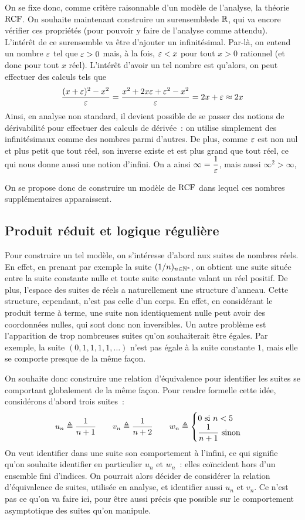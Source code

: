 On se fixe donc, comme critère raisonnable d'un modèle de l'analyse, la théorie
$\operatorname{RCF}$. On souhaite maintenant construire un \og surensemble\fg de $\mathbb R$, qui
va encore vérifier ces propriétés (pour pouvoir y faire de l'analyse comme
attendu). L'intérêt de ce surensemble va être d'ajouter un infinitésimal.
Par-là, on entend un nombre $\varepsilon$ tel que $\varepsilon > 0$ mais, à la fois,
$\varepsilon < x$ pour tout $x > 0$ rationnel (et donc pour tout $x$ réel).
L'intérêt d'avoir un tel nombre est qu'alors, on peut effectuer des calculs
tels que
\[\frac{(x+\varepsilon)^2 - x^2}{\varepsilon} =
\frac{x^2 + 2x \varepsilon + \varepsilon^2 - x^2}{\varepsilon}
= 2x + \varepsilon \approx 2x\]
Ainsi, en analyse non standard, il devient possible de se passer des notions
de dérivabilité pour effectuer des calculs de dérivée~: on utilise simplement
des infinitésimaux comme des nombres parmi d'autres. De plus, comme $\varepsilon$
est non nul et plus petit que tout réel, son inverse existe et est plus
grand que tout réel, ce qui nous donne aussi une notion d'infini. On a ainsi
$\infty = \dfrac{1}{\varepsilon}$, mais aussi $\infty^2 > \infty$, 

On se propose donc de construire un modèle de $\operatorname{RCF}$ dans lequel ces nombres
supplémentaires apparaissent.

\subsection{Produit réduit et logique régulière}

Pour construire un tel modèle, on s'intéresse d'abord aux suites de nombres
réels. En effet, en prenant par exemple la suite $(1/n)_{n\in \mathbb N^*}$, on obtient
une suite située entre la suite constante nulle et toute suite constante valant
un réel positif. De plus, l'espace des suites de réels a naturellement une
structure d'anneau. Cette structure, cependant, n'est pas celle d'un corps.
En effet, en considérant le produit terme à terme, une suite non identiquement
nulle peut avoir des coordonnées nulles, qui sont donc non inversibles.
Un autre problème est l'apparition de trop nombreuses suites qu'on souhaiterait
être égales. Par exemple, la suite $(0,1,1,1,1,\ldots)$ n'est pas égale à la
suite constante $1$, mais elle se comporte presque de la même façon.

On souhaite donc construire une relation d'équivalence pour identifier les
suites se comportant globalement de la même façon. Pour rendre formelle cette
idée, considérons d'abord trois suites~:
\[
u_n \triangleq \dfrac{1}{n+1} \qquad
v_n \triangleq \dfrac{1}{n+2} \qquad
w_n \triangleq \begin{cases}
  0 \text{ si } n < 5\\
  \dfrac{1}{n+1}\text{ sinon}
\end{cases}
\]
On veut identifier dans une suite son comportement à l'infini, ce qui signifie
qu'on souhaite identifier en particulier $u_n$ et $w_n$~: elles coïncident hors
d'un ensemble fini d'indices. On pourrait alors décider de considérer la
relation d'équivalence de suites, utilisée en analyse, et identifier aussi
$u_n$ et $v_n$. Ce n'est pas ce qu'on va faire ici, pour être aussi précis que
possible sur le comportement asymptotique des suites qu'on manipule.

